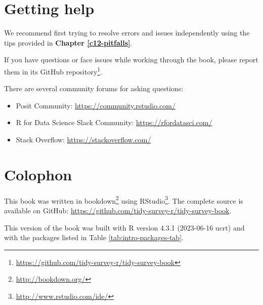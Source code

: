 \documentclass[
]{krantz}
\providecommand{\tightlist}{%
  \setlength{\itemsep}{0pt}\setlength{\parskip}{0pt}}
\renewcommand{\href}[2]{#2\footnote{\url{#1}}}
\begin{document}
\hypertarget{getting-help}{%
\section{Getting help}\label{getting-help}}

We recommend first trying to resolve errors and issues independently using the tips provided in \textbf{Chapter \ref{c12-pitfalls}}.

If you have questions or face issues while working through the book, please report them in its \href{https://github.com/tidy-survey-r/tidy-survey-book}{GitHub repository}.

There are several community forums for asking questions:

\begin{itemize}
\tightlist
\item
  Posit Community: \url{https://community.rstudio.com/}
\item
  R for Data Science Slack Community: \url{https://rfordatasci.com/}
\item
  Stack Overflow: \url{https://stackoverflow.com/}
\end{itemize}

\hypertarget{colophon}{%
\section{Colophon}\label{colophon}}

This book was written in \href{http://bookdown.org/}{bookdown} using \href{http://www.rstudio.com/ide/}{RStudio}. The complete source is available on GitHub: \url{https://github.com/tidy-survey-r/tidy-survey-book}.

This version of the book was built with R version 4.3.1 (2023-06-16 ucrt) and with the packages listed in Table \ref{tab:intro-packages-tab}.
\end{document}
